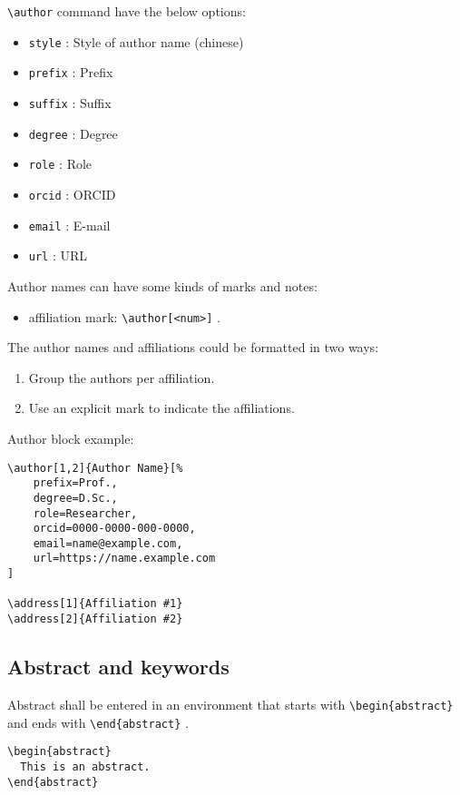 \documentclass[%
twocolumn
]{ceurart}
\begin{document}
\verb|\author|
command have the below options:
\begin{itemize}
\item
\verb|style|
 : Style of author name (chinese)
\item
\verb|prefix|
 : Prefix
\item
\verb|suffix|
 : Suffix
\item
\verb|degree|
 : Degree
\item
\verb|role|
 : Role
\item
\verb|orcid|
 : ORCID
\item
\verb|email|
 : E-mail
\item
\verb|url|
 : URL
\end{itemize}

Author names can have some kinds of marks and notes:
\begin{itemize}
\item affiliation mark:
\verb|\author[<num>]|
.
\end{itemize}

The author names and affiliations could be formatted in two ways:
\begin{enumerate}
\item Group the authors per affiliation.
\item Use an explicit mark to indicate the affiliations.
\end{enumerate}

Author block example:
\begin{lstlisting}[language={[latex]TeX}]
\author[1,2]{Author Name}[%
    prefix=Prof.,
    degree=D.Sc.,
    role=Researcher,
    orcid=0000-0000-000-0000,
    email=name@example.com,
    url=https://name.example.com
]

\address[1]{Affiliation #1}
\address[2]{Affiliation #2}
\end{lstlisting}

\subsection{Abstract and keywords}

Abstract shall be entered in an environment that starts with
\verb|\begin{abstract}|
 and ends with
\verb|\end{abstract}|
.

\begin{lstlisting}[language={[latex]TeX}]
\begin{abstract}
  This is an abstract.
\end{abstract}
\end{lstlisting}
\end{document}
